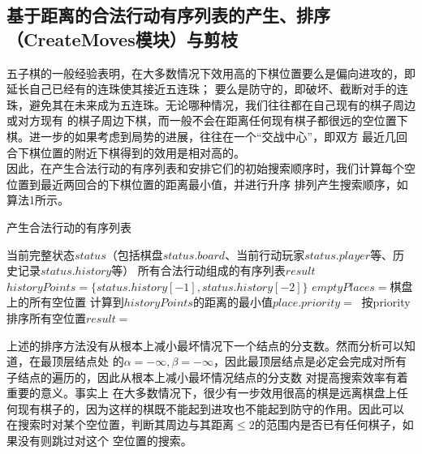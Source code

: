 \documentclass{acm_proc_article-sp}
\begin{document}
\subsection{\textbf{基于距离的合法行动有序列表的产生、排序（CreateMoves模块）与剪枝}}
五子棋的一般经验表明，在大多数情况下效用高的下棋位置要么是偏向进攻的，即延长自己已经有的连珠使其接近五连珠；
要么是防守的，即破坏、截断对手的连珠，避免其在未来成为五连珠。无论哪种情况，我们往往都在自己现有的棋子周边或对方现有
的棋子周边下棋，而一般不会在距离任何现有棋子都很远的空位置下棋。进一步的如果考虑到局势的进展，往往在一个“交战中心”，即双方
最近几回合下棋位置的附近下棋得到的效用是相对高的。\\
因此，在产生合法行动的有序列表和安排它们的初始搜索顺序时，我们计算每个空位置到最近两回合的下棋位置的距离最小值，并进行升序
排列产生搜索顺序，如算法1所示。\\
\begin{algorithm}
    \algsetup{\tiny}
    \scriptsize
    \caption{产生合法行动的有序列表}
    \begin{algorithmic}[1] %
        \Require 当前完整状态$status$（包括棋盘$status.board$、当前行动玩家$status.player$等、历史记录$status.history$等）
        \Ensure 所有合法行动组成的有序列表$result$
        \State $historyPoints = \{status.history[-1], status.history[-2]\}$
        \State $emptyPlaces = $棋盘上的所有空位置
        \State 计算到$historyPoints$的距离的最小值$place.priority =\ $
        \EndFor
        \State 按priority排序所有空位置$result =\ $
        \State {}
        \EndFunction
    \end{algorithmic}
\end{algorithm}
上述的排序方法没有从根本上减小最坏情况下一个结点的分支数。然而分析可以知道，在最顶层结点处
的$\alpha=-\infty, \beta=-\infty$，因此最顶层结点是必定会完成对所有子结点的遍历的，因此从根本上减小最坏情况结点的分支数
对提高搜索效率有着重要的意义。事实上
在大多数情况下，很少有一步效用很高的棋是远离棋盘上任何现有棋子的，因为这样的棋既不能起到进攻也不能起到防守的作用。因此可以
在搜索时对某个空位置，判断其周边与其距离$\leq2$的范围内是否已有任何棋子，如果没有则跳过对这个
空位置的搜索。\\
\end{document}
